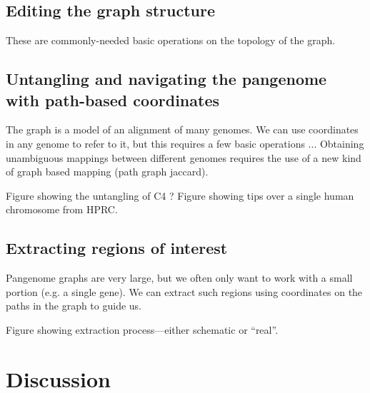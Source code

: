 \documentclass{bioinfo}
\begin{document}



\subsection{Editing the graph structure}


These are commonly-needed basic operations on the topology of the graph.

\subsection{Untangling and navigating the pangenome with path-based coordinates}


The graph is a model of an alignment of many genomes.
We can use coordinates in any genome to refer to it, but this requires a few basic operations ...
Obtaining unambiguous mappings between different genomes requires the use of a new kind of graph based mapping (path graph jaccard).

Figure showing the untangling of C4 ?
Figure showing tips over a single human chromosome from HPRC.

\subsection{Extracting regions of interest}


Pangenome graphs are very large, but we often only want to work with a small portion (e.g. a single gene).
We can extract such regions using coordinates on the paths in the graph to guide us.

Figure showing extraction process---either schematic or ``real''.

\section{Discussion}

\end{document}
